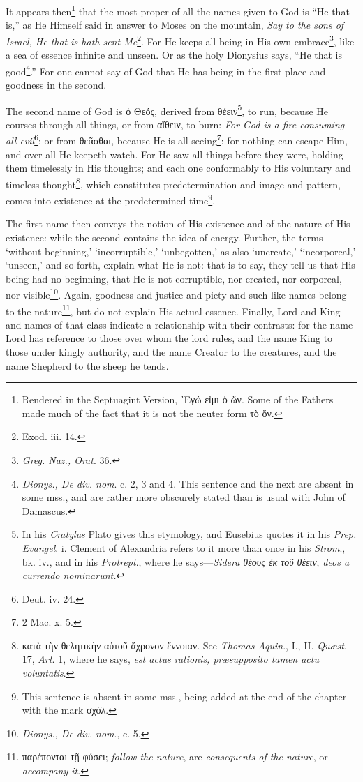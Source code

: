 It appears then\footnote{Rendered in the Septuagint Version, \textgreek{᾽Εγώ εἰμι ὁ ὤν}. Some of the Fathers made much of the fact that it is not the neuter form \textgreek{τὸ ὄν}.} that the most proper of all the names given to God is “He that is,” as He Himself said in answer to Moses on the mountain, \emph{Say to the sons of Israel, He that is hath sent Me}\footnote{Exod. iii. 14.}. For He keeps all being in His own embrace\footnote{\emph{Greg. Naz., Orat}. 36.}, like a sea of essence infinite and unseen. Or as the holy Dionysius says, “He that is good\footnote{\emph{Dionys., De div. nom}. c. 2, 3 and 4. This sentence and the next are absent in some mss., and are rather more obscurely stated than is usual with John of Damascus.}.” For one cannot say of God that He has being in the first place and goodness in the second.

The second name of God is \textgreek{ὁ Θεός}, derived from \textgreek{θέειν}\footnote{In his \emph{Cratylus }Plato gives this etymology, and Eusebius quotes it in his \emph{Prep. Evangel}. i. Clement of Alexandria refers to it more than once in his \emph{Strom}., bk. iv., and in his \emph{Protrept}., where he says—\emph{Sidera θέους ἐκ τοῦ θέειν}, \emph{deos a currendo nominarunt.}}, to run, because He courses through all things, or from \textgreek{αἴθειν}, to burn: \emph{For God is a fire consuming all evil}\footnote{Deut. iv. 24.}: or from \textgreek{θεᾶσθαι}, because He is all-seeing\footnote{2 Mac. x. 5.}: for nothing can escape Him, and over all He keepeth watch. For He saw all things before they were, holding them timelessly in His thoughts; and each one conformably to His voluntary and timeless thought\footnote{\textgreek{κατὰ τὴν θελητικὴν αὐτοῦ ἄχρονον ἔννοιαν}. See \emph{Thomas Aquin}., I., II. \emph{Quæst}. 17, \emph{Art}. 1, where he says, \emph{est actus rationis, præsupposito tamen actu voluntatis}.}, which constitutes predetermination and image and pattern, comes into existence at the predetermined time\footnote{This sentence is absent in some mss., being added at the end of the chapter with the mark \textgreek{σχόλ}.}.

The first name then conveys the notion of His existence and of the nature of His existence: while the second contains the idea of energy. Further, the terms ‘without beginning,’ ‘incorruptible,’ ‘unbegotten,’ as also ‘uncreate,’ ‘incorporeal,’ ‘unseen,’ and so forth, explain what He is not: that is to say, they tell us that His being had no beginning, that He is not corruptible, nor created, nor corporeal, nor visible\footnote{\emph{Dionys., De div. nom}., c. 5.}. Again, goodness and justice and piety and such like names belong to the nature\footnote{\textgreek{παρέπονται τῇ φύσει}; \emph{follow the nature}, are \emph{consequents of the nature}, or \emph{accompany it}.}, but do not explain His actual essence. Finally, Lord and King and names of that class indicate a relationship with their contrasts: for the name Lord has reference to those over whom the lord rules, and the name King to those under kingly authority, and the name Creator to the creatures, and the name Shepherd to the sheep he tends.

